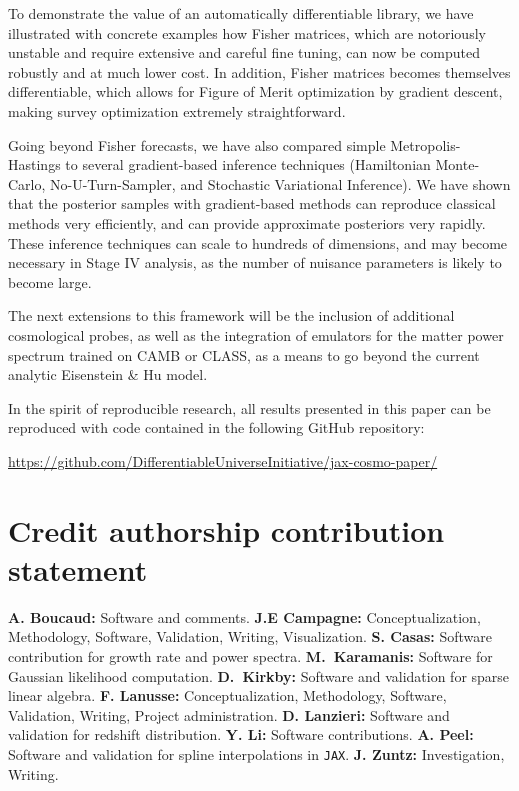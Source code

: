 \documentclass[twocolumn,twocolappendix,nofootinbib,iop]{openjournal}
\newcommand{\jax}{\texttt{JAX}}
\begin{document}
To demonstrate the value of an automatically differentiable library, we have illustrated with concrete examples how Fisher matrices, which are notoriously unstable and require extensive and careful fine tuning, can now be computed robustly and at much lower cost. In addition, Fisher matrices becomes themselves differentiable, which allows for  Figure of Merit optimization by gradient descent, making survey optimization extremely straightforward. 

Going beyond Fisher forecasts, we have also compared simple Metropolis-Hastings to several gradient-based inference techniques (Hamiltonian Monte-Carlo, No-U-Turn-Sampler, and Stochastic Variational Inference). We have shown that the posterior samples with gradient-based methods can reproduce classical methods very efficiently, and can provide approximate posteriors very rapidly. These inference techniques can scale to hundreds of dimensions, and may become necessary in Stage IV analysis, as the number of nuisance parameters is likely to become large.

The next extensions to this framework will be the inclusion of additional cosmological probes, as well as the integration of emulators for the matter power spectrum trained on CAMB or CLASS, as a means to go beyond the current analytic Eisenstein \& Hu model.

In the spirit of reproducible research, all results presented in this paper can be reproduced with code contained in the following GitHub repository:

\url{https://github.com/DifferentiableUniverseInitiative/jax-cosmo-paper/}



\section*{Credit authorship contribution statement}
\textbf{A. Boucaud:} Software and comments.
\textbf{J.E Campagne:} Conceptualization, Methodology, Software, Validation, Writing, Visualization.
\textbf{S. Casas:} Software contribution for growth rate and power spectra.
\textbf{M.~Karamanis:} Software for Gaussian likelihood computation.
\textbf{D.~Kirkby:} Software and validation for sparse linear algebra.
\textbf{F. Lanusse:} Conceptualization, Methodology, Software, Validation, Writing, Project administration.
\textbf{D. Lanzieri:} Software and validation for redshift distribution.
\textbf{Y. Li:} Software contributions.
\textbf{A. Peel:} Software and validation for spline interpolations in \jax.
\textbf{J. Zuntz:} Investigation, Writing.
\end{document}
